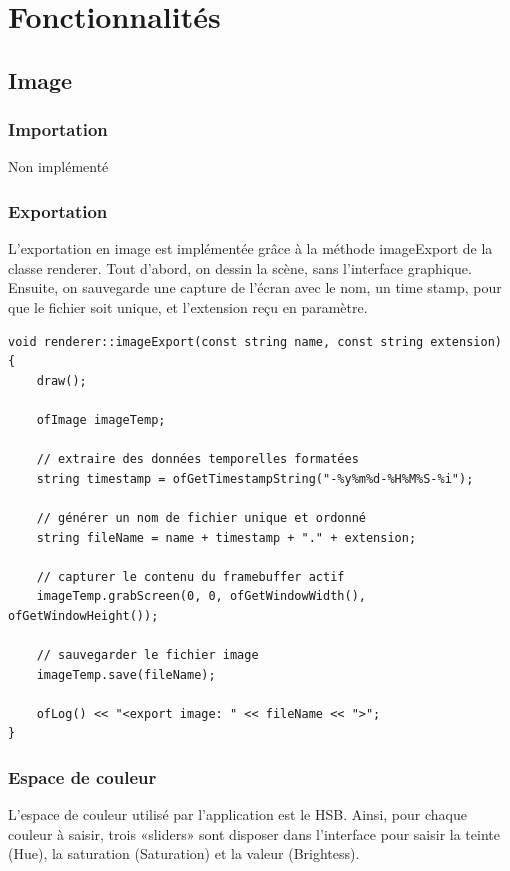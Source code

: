 \chapter{Fonctionnalités}
\label{s:fonctionnalite}

\section{Image}
\subsection{Importation}
Non implémenté

\subsection{Exportation}
L'exportation en image est implémentée grâce à la méthode imageExport de la classe renderer. Tout d’abord, on dessin la scène, sans l’interface graphique. Ensuite, on sauvegarde une capture de l’écran avec le nom, un time stamp, pour que le fichier soit unique, et l’extension reçu en paramètre.

\begin{lstlisting}
void renderer::imageExport(const string name, const string extension)
{
	draw();
	
	ofImage imageTemp;
	
	// extraire des données temporelles formatées
	string timestamp = ofGetTimestampString("-%y%m%d-%H%M%S-%i");
	
	// générer un nom de fichier unique et ordonné
	string fileName = name + timestamp + "." + extension;
	
	// capturer le contenu du framebuffer actif
	imageTemp.grabScreen(0, 0, ofGetWindowWidth(), ofGetWindowHeight());
	
	// sauvegarder le fichier image
	imageTemp.save(fileName);
	
	ofLog() << "<export image: " << fileName << ">";
}
\end{lstlisting}


\subsection{Espace de couleur}
 L'espace de couleur utilisé par l'application est le HSB. Ainsi, pour chaque couleur à saisir, trois «sliders» sont disposer dans l'interface pour saisir la teinte (Hue), la saturation (Saturation) et la valeur (Brightess).
 
